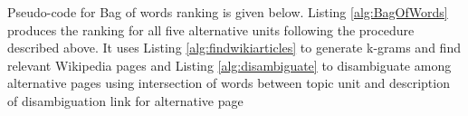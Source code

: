 \documentclass[12pt]{article}
\begin{document}
Pseudo-code for Bag of words ranking is given below. Listing \ref{alg:BagOfWords} produces the ranking for all five alternative units following the procedure described above. It uses Listing \ref{alg:findwikiarticles} to generate k-grams and find relevant Wikipedia pages and Listing \ref{alg:disambiguate} to disambiguate among alternative pages using intersection of words between topic unit and description of disambiguation link for alternative page

%		
%
%
%
\end{document}
